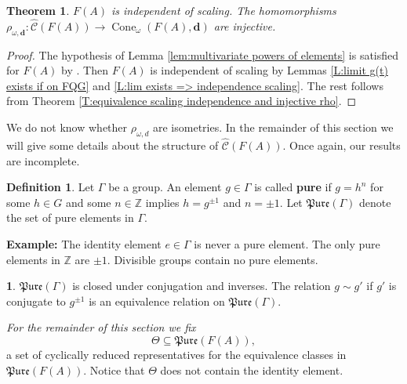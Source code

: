 \documentclass[12pt]{amsart}
\newtheorem{theorem}[prop]{Theorem}
\theoremstyle{definition}
\newtheorem{defn}[prop]{Definition}
\newtheorem{void}[prop]{}
\newtheorem*{example*}{Example}
\def\ZZ{\ensuremath{\mathbb{Z}}}
\newcommand{\B}[1]{\mathbf{#1}}
\newcommand{\OP}[1]{\operatorname{#1}}
\def\Cone{\OP{Cone}}
\def\Pure{\mathfrak{Pure}}
\def\Free{F}
\def\tC{\hat{\mathcal{C}}}
\begin{document}
\begin{theorem}\label{theorem:F(A) independent of scaling}
$\Free(A)$ is independent of scaling.
The homomorphisms $\rho_{\omega,\B d} \colon \tC(\Free(A)) \to \Cone_\omega(\Free(A),\B d)$ are injective.
\end{theorem}


\begin{proof}
The hypothesis of Lemma \ref{lem:multivariate powers of elements} is satisfied for $\Free(A)$ by \cite[Theorem 1.1, Example 1.2]{MR4741237}.
Then $\Free(A)$ is independent of scaling by Lemmas \ref{L:limit g(t) exists if on FQG} and \ref{L:lim exists => independence scaling}.
The rest follows from Theorem \ref{T:equivalence scaling independence and injective rho}.
\end{proof}


We do not know whether $\rho_{\omega, d}$ are isometries.
In the remainder of this section we will give some details about the structure of $\tC(\Free(A))$.
Once again, our results are incomplete.



\begin{defn}
Let $\Gamma$ be a group.
An element $g \in \Gamma$ is called {\bf pure} if $g=h^n$ for some $h \in G$ and some $n \in \ZZ$ implies $h=g^{\pm 1}$ and $n=\pm 1$.
Let $\Pure(\Gamma)$ denote the set of pure elements in $\Gamma$.
\end{defn}



\noindent
{\bf Example:}
The identity element $e \in \Gamma$ is never a pure element.
The only pure elements in $\ZZ$ are $\pm 1$.
Divisible groups contain no pure elements.





\begin{void}\label{par:Fix Theta in F(A)}
$\Pure(\Gamma)$ is closed under conjugation and inverses.
The relation $g \sim g'$ if $g'$ is conjugate to $g^{\pm 1}$ is an equivalence relation on $\Pure(\Gamma)$.

{\em For the remainder of this section we fix}
\[
\Theta \subseteq \Pure(\Free(A)),
\]
a set of cyclically reduced representatives for the equivalence classes in $\Pure(\Free(A))$.
Notice that $\Theta$ does not contain the identity element.
\end{void}
\end{document}
